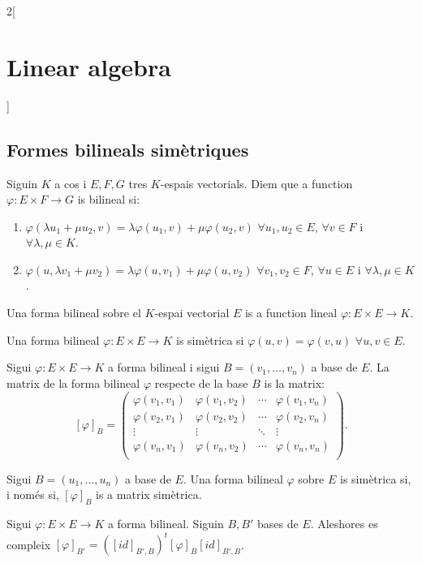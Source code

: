 \documentclass[../../../main.tex]{subfiles}
\begin{document}
\begin{multicols}{2}[\section{Linear algebra}]
\subsection{Formes bilineals simètriques}
\begin{definition}
Siguin $K$ a cos i $E,F,G$ tres $K$-espais vectorials. Diem que a function $\varphi:E\times F\rightarrow G$ is bilineal si:
\begin{enumerate}
    \item $\varphi(\lambda u_1+\mu u_2,v)=\lambda \varphi(u_1,v)+\mu \varphi(u_2,v)$ $\forall u_1,u_2\in E$, $\forall v\in F$ i $\forall\lambda,\mu\in K$.
    \item $\varphi(u,\lambda v_1+\mu v_2)=\lambda \varphi(u,v_1)+\mu \varphi(u,v_2)$ $\forall v_1,v_2\in F$, $\forall u\in E$ i $\forall\lambda,\mu\in K$.
\end{enumerate}
\end{definition}
\begin{definition}
Una forma bilineal sobre el $K$-espai vectorial $E$ is a function lineal $\varphi:E\times E\rightarrow K$.
\end{definition}
\begin{definition}
Una forma bilineal $\varphi:E\times E\rightarrow K$ is simètrica si $\varphi(u,v)=\varphi(v,u)$ $\forall u,v\in E$.
\end{definition}
\begin{definition}
Sigui $\varphi:E\times E\rightarrow K$ a forma bilineal i sigui $B=(v_1,\ldots,v_n)$ a base de $E$. La matrix de la forma bilineal $\varphi$ respecte de la base $B$ is la matrix: $$[\varphi]_B=\begin{pmatrix}
\varphi(v_1,v_1) & \varphi(v_1,v_2) & \cdots & \varphi(v_1,v_n) \\
\varphi(v_2,v_1) & \varphi(v_2,v_2) & \cdots & \varphi(v_2,v_n) \\
\vdots & \vdots & \ddots & \vdots \\
\varphi(v_n,v_1) & \varphi(v_n,v_2) & \cdots & \varphi(v_n,v_n) \\
\end{pmatrix}.$$ 
\end{definition}
\begin{prop}
Sigui $B=(u_1,\ldots,u_n)$ a base de $E$. Una forma bilineal $\varphi$ sobre $E$ is simètrica si, i només si, $[\varphi]_B$ is a matrix simètrica.
\end{prop}
\begin{prop}
Sigui $\varphi:E\times E\rightarrow K$ a forma bilineal. Siguin $B,B'$ bases de $E$. Aleshores es compleix $[\varphi]_{B'}=([id]_{B',B})^t[\varphi]_B[id]_{B',B}$.

\end{prop}
\end{multicols}
\end{document}
